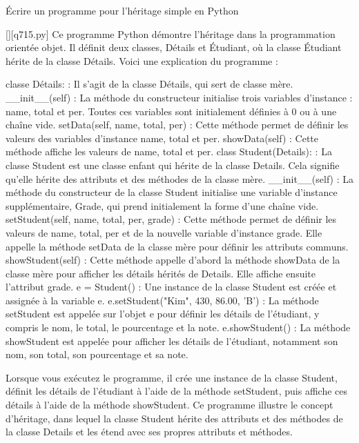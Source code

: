         \question
        Écrire un programme pour l'héritage simple en Python
        \par
        \begin{solution}
            \renewcommand{\nomfichier}{q715.py}
            \pythonfile{\chemincode \nomfichier}[][\nomfichier]
            Ce programme Python démontre l'héritage dans la programmation orientée objet. Il définit deux classes, Détails et Étudiant, où la classe Étudiant hérite de la classe Détails. Voici une explication du programme :

    classe Détails: : Il s'agit de la classe Détails, qui sert de classe mère.
        __init__(self) : La méthode du constructeur initialise trois variables d'instance : name, total et per. Toutes ces variables sont initialement définies à 0 ou à une chaîne vide.
        setData(self, name, total, per) : Cette méthode permet de définir les valeurs des variables d'instance name, total et per.
        showData(self) : Cette méthode affiche les valeurs de name, total et per.
    class Student(Details): : La classe Student est une classe enfant qui hérite de la classe Details. Cela signifie qu'elle hérite des attributs et des méthodes de la classe mère.
        __init__(self) : La méthode du constructeur de la classe Student initialise une variable d'instance supplémentaire, Grade, qui prend initialement la forme d'une chaîne vide.
        setStudent(self, name, total, per, grade) : Cette méthode permet de définir les valeurs de name, total, per et de la nouvelle variable d'instance grade. Elle appelle la méthode setData de la classe mère pour définir les attributs communs.
        showStudent(self) : Cette méthode appelle d'abord la méthode showData de la classe mère pour afficher les détails hérités de Details. Elle affiche ensuite l'attribut grade.
    e = Student() : Une instance de la classe Student est créée et assignée à la variable e.
    e.setStudent("Kim", 430, 86.00, 'B') : La méthode setStudent est appelée sur l'objet e pour définir les détails de l'étudiant, y compris le nom, le total, le pourcentage et la note.
    e.showStudent() : La méthode showStudent est appelée pour afficher les détails de l'étudiant, notamment son nom, son total, son pourcentage et sa note.

Lorsque vous exécutez le programme, il crée une instance de la classe Student, définit les détails de l'étudiant à l'aide de la méthode setStudent, puis affiche ces détails à l'aide de la méthode showStudent. Ce programme illustre le concept d'héritage, dans lequel la classe Student hérite des attributs et des méthodes de la classe Details et les étend avec ses propres attributs et méthodes.
        \end{solution}
        

